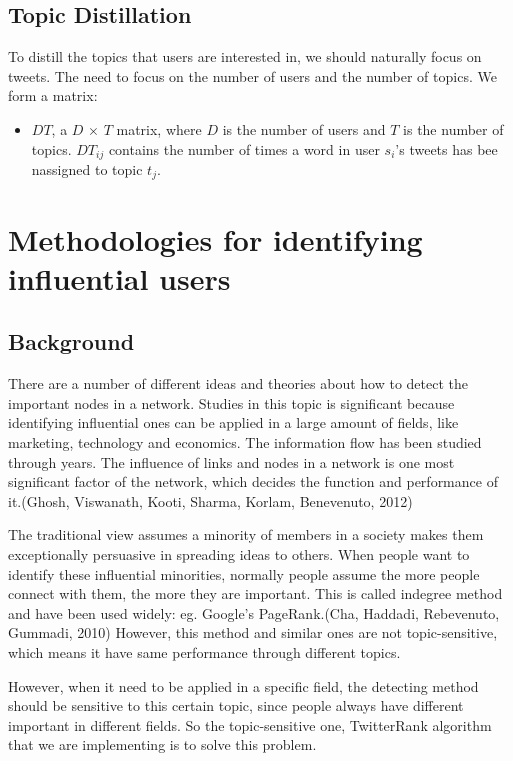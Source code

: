 \documentclass[conference]{IEEEtran}
\theoremstyle{definition}
\begin{document}
\subsection{Topic Distillation}\label{AA}
To distill the topics that \textup{users} are interested in, we should naturally focus on \textup{tweets}. The need to focus on the number of users and the number of topics. We form a matrix: 

\begin{itemize}
	\item $DT$, a $D$ $\times$ $T$ matrix, where $D$ is the number of \textup{users} and $T$ is the number of topics. $DT_{ij}$ contains the number of times a word in \textup{user} $s_i$'s \textup{tweets} has bee nassigned to topic $t_j$.
\end{itemize}


\section{Methodologies for identifying influential users}
\subsection{Background}
There are a number of different ideas and theories about how to detect the important nodes in a network. Studies in this topic is significant because identifying influential ones can be applied in a large amount of fields, like marketing, technology and economics. The information flow has been studied through years. The influence of links and nodes in a network is one most significant factor of the network, which decides the function and performance of it.(Ghosh, Viswanath, Kooti, Sharma, Korlam, Benevenuto, 2012)

The traditional view assumes a minority of members in a society makes them exceptionally persuasive in spreading ideas to others. When people want to identify these influential minorities, normally people assume the more people connect with them, the more they are important. This is called indegree method and have been used widely: eg. Google's PageRank.(Cha, Haddadi, Rebevenuto, Gummadi, 2010) However, this method and similar ones are not topic-sensitive, which means it have same performance through different topics.

However, when it need to be applied in a specific field, the detecting method should be sensitive to this certain topic, since people always have different important in different fields. So the topic-sensitive one, TwitterRank algorithm that we are implementing is to solve this problem. 
\end{document}
